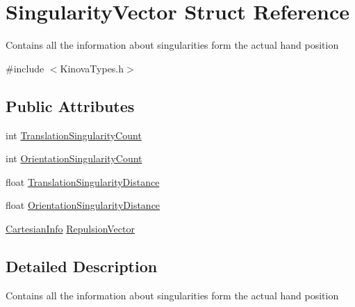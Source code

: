 \hypertarget{struct_singularity_vector}{\section{Singularity\-Vector Struct Reference}
\label{struct_singularity_vector}
}


\par
Contains all the information about singularities form the actual hand position  




{\ttfamily \#include $<$Kinova\-Types.\-h$>$}

\subsection*{Public Attributes}
\begin{DoxyCompactItemize}
\item 
int \hyperlink{struct_singularity_vector_ac65570b58281f94cea000ede75de19ae}{Translation\-Singularity\-Count}
\item 
int \hyperlink{struct_singularity_vector_a7ea72e4a459d41c935135c581e6763b1}{Orientation\-Singularity\-Count}
\item 
float \hyperlink{struct_singularity_vector_affe09808366cb7e82427a978cbb1af6a}{Translation\-Singularity\-Distance}
\item 
float \hyperlink{struct_singularity_vector_ae04b0dd5f44b2d696d36860ecb7b9f35}{Orientation\-Singularity\-Distance}
\item 
\hyperlink{struct_cartesian_info}{Cartesian\-Info} \hyperlink{struct_singularity_vector_adc7115ff6fe262ef37a1bff2ebbdbfee}{Repulsion\-Vector}
\end{DoxyCompactItemize}


\subsection{Detailed Description}
\par
Contains all the information about singularities form the actual hand position 



